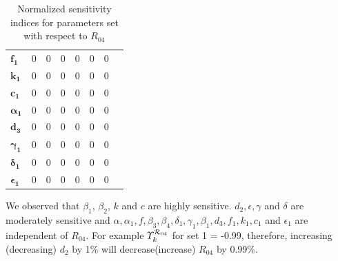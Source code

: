 \begin{table}
\begin{tabular}{|p{3cm}|p{1.6cm}|p{1.6cm}|p{1.6cm}|p{1.6cm}|p{1.6cm}|p{1.6cm}|p{1.6cm}|}
  $\mathbf{f_{1} } $         & 0 & 0 & 0 & 0 & 0 & 0  \\
  $\mathbf{k_{1} }  $        & 0 & 0 & 0 & 0 & 0 & 0  \\
  $\mathbf{c_{1} } $         & 0 & 0 & 0 & 0 & 0 & 0  \\
  $\boldsymbol {\alpha_{1}}$          & 0 & 0 & 0 & 0 & 0 & 0  \\
  $\mathbf{d_{3}}$          & 0 & 0 & 0 & 0 & 0 & 0  \\
  $\boldsymbol {\gamma_{1}}$          & 0 & 0 & 0 & 0 & 0 & 0  \\
  $\boldsymbol {\delta_{1}}$         & 0 & 0 & 0 & 0 & 0 & 0  \\
  $\boldsymbol {\epsilon_{1}}$          & 0 & 0 & 0 & 0 & 0 & 0  \\
  \hline
    \end{tabular}
\caption{Normalized sensitivity indices for parameters set with respect to $R_{04}$}\label{T5}
\end{table}
\noindent We observed that $\beta_{1}$, $\beta_{2}$, $k$ and $c$ are highly sensitive. $d_{2}, \epsilon, \gamma$ and $\delta$  are moderately sensitive and $\alpha,\alpha_{1}, f,\beta_{3},\beta_{4},\delta_{1},\gamma_{1}, \beta_{1},d_{3}, f_{1}, k_{1}, c_{1}$ and $\epsilon_{1}$ are independent of $R_{04}$. For example $\varUpsilon^{{{\cal R}}_{04}}_{k}$ for set 1 = -0.99, therefore, increasing (decreasing) $d_{2}$ by 1\% will decrease(increase) $R_{04}$ by 0.99\%.




